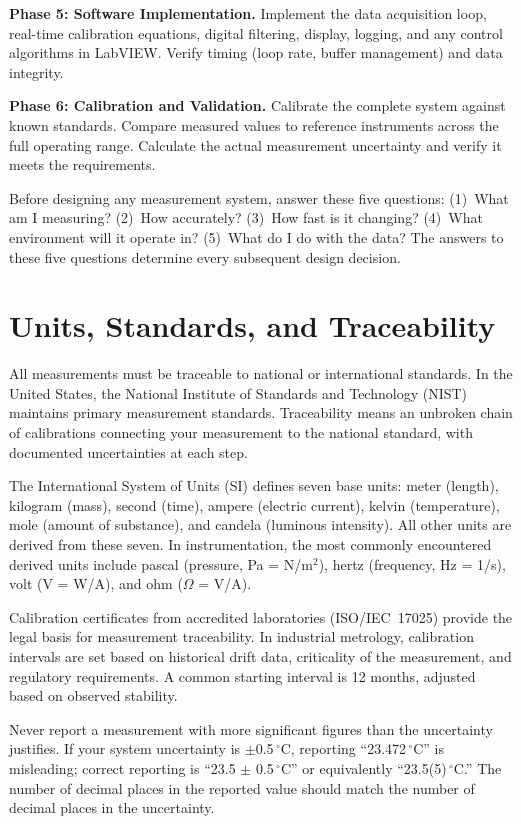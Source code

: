 \documentclass[11pt,letterpaper,twoside,openany]{book}
\newcommand{\degC}{\ensuremath{{}^{\circ}\text{C}}}
\begin{document}
\textbf{Phase 5: Software Implementation.} Implement the data acquisition loop, real-time calibration equations, digital filtering, display, logging, and any control algorithms in LabVIEW. Verify timing (loop rate, buffer management) and data integrity.

\textbf{Phase 6: Calibration and Validation.} Calibrate the complete system against known standards. Compare measured values to reference instruments across the full operating range. Calculate the actual measurement uncertainty and verify it meets the requirements.

\begin{tipbox}
Before designing any measurement system, answer these five questions: (1)~What am I measuring? (2)~How accurately? (3)~How fast is it changing? (4)~What environment will it operate in? (5)~What do I do with the data? The answers to these five questions determine every subsequent design decision.
\end{tipbox}

\section{Units, Standards, and Traceability}
All measurements must be traceable to national or international standards. In the United States, the National Institute of Standards and Technology (NIST) maintains primary measurement standards. Traceability means an unbroken chain of calibrations connecting your measurement to the national standard, with documented uncertainties at each step.

The International System of Units (SI) defines seven base units: meter (length), kilogram (mass), second (time), ampere (electric current), kelvin (temperature), mole (amount of substance), and candela (luminous intensity). All other units are derived from these seven. In instrumentation, the most commonly encountered derived units include pascal (pressure, Pa = N/m$^2$), hertz (frequency, Hz = 1/s), volt (V = W/A), and ohm ($\Omega$ = V/A).

Calibration certificates from accredited laboratories (ISO/IEC~17025) provide the legal basis for measurement traceability. In industrial metrology, calibration intervals are set based on historical drift data, criticality of the measurement, and regulatory requirements. A common starting interval is 12 months, adjusted based on observed stability.

\begin{warningbox}
Never report a measurement with more significant figures than the uncertainty justifies. If your system uncertainty is $\pm$0.5\,\degC{}, reporting ``23.472\,\degC{}'' is misleading; correct reporting is ``23.5 $\pm$ 0.5\,\degC{}'' or equivalently ``23.5(5)\,\degC{}.'' The number of decimal places in the reported value should match the number of decimal places in the uncertainty.
\end{warningbox}
\end{document}
